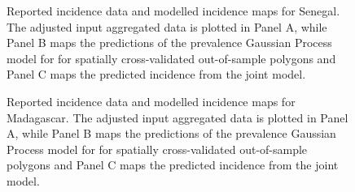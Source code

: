 \documentclass{statsoc}
\begin{document}
\begin{figure}
\caption{\label{predobsmapsen}
Reported incidence data and modelled incidence maps for Senegal. 
The adjusted input aggregated data is plotted in Panel A, while Panel B maps the predictions of the prevalence Gaussian Process model for for spatially cross-validated out-of-sample polygons and Panel C maps the predicted incidence from the joint model.
}

\end{figure}



\begin{figure}
\caption{\label{predobsmapmdg}
Reported incidence data and modelled incidence maps for Madagascar. 
The adjusted input aggregated data is plotted in Panel A, while Panel B maps the predictions of the prevalence Gaussian Process model for for spatially cross-validated out-of-sample polygons and Panel C maps the predicted incidence from the joint model.
}

\end{figure}
\end{document}
